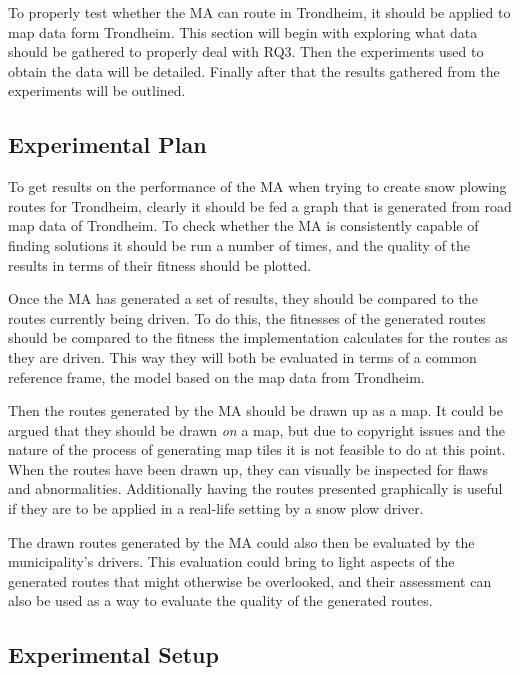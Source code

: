To properly test whether the MA can route in Trondheim, it should be applied to map data form Trondheim. This section will begin with exploring what data should be gathered to properly deal with RQ3. Then the experiments used to obtain the data will be detailed. Finally after that the results gathered from the experiments will be outlined.

\subsection{Experimental Plan}

To get results on the performance of the MA when trying to create snow plowing routes for Trondheim, clearly it should be fed a graph that is generated from road map data of Trondheim. To check whether the MA is consistently capable of finding solutions it should be run a number of times, and the quality of the results in terms of their fitness should be plotted.

Once the MA has generated a set of results, they should be compared to the routes currently being driven. To do this, the fitnesses of the generated routes should be compared to the fitness the implementation calculates for the routes as they are driven. This way they will both be evaluated in terms of a common reference frame, the model based on the map data from Trondheim.

Then the routes generated by the MA should be drawn up as a map. It could be argued that they should be drawn \emph{on} a map, but due to copyright issues and the nature of the process of generating map tiles it is not feasible to do at this point. When the routes have been drawn up, they can visually be inspected for flaws and abnormalities. Additionally having the routes presented graphically is useful if they are to be applied in a real-life setting by a snow plow driver.

The drawn routes generated by the MA could also then be evaluated by the municipality's drivers. This evaluation could bring to light aspects of the generated routes that might otherwise be overlooked, and their assessment can also be used as a way to evaluate the quality of the generated routes.

\subsection{Experimental Setup}

